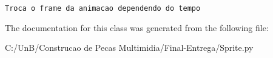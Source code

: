 \begin{footnotesize}\begin{verbatim}Troca o frame da animacao dependendo do tempo\end{verbatim}
\end{footnotesize}
 

The documentation for this class was generated from the following file:\begin{CompactItemize}
\item 
C:/UnB/Construcao de Pecas Multimidia/Final-Entrega/Sprite.py\end{CompactItemize}
